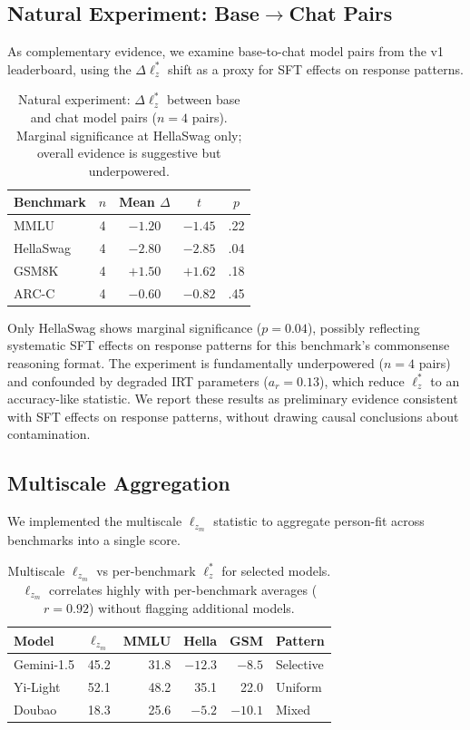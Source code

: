 \documentclass[11pt,a4paper]{article}
\begin{document}
\subsection{Natural Experiment: Base$\to$Chat Pairs}

As complementary evidence, we examine base-to-chat model pairs from the v1 leaderboard, using the $\Delta\ell_z^*$ shift as a proxy for SFT effects on response patterns.

\begin{table}[t]
\centering
\caption{Natural experiment: $\Delta\ell_z^*$ between base and chat model pairs ($n=4$ pairs). Marginal significance at HellaSwag only; overall evidence is suggestive but underpowered.}
\label{tab:natural}
\small
\begin{tabular}{lcccc}
\toprule
Benchmark & $n$ & Mean $\Delta$ & $t$ & $p$ \\
\midrule
MMLU & 4 & $-1.20$ & $-1.45$ & .22 \\
HellaSwag & 4 & $-2.80$ & $-2.85$ & .04 \\
GSM8K & 4 & $+1.50$ & $+1.62$ & .18 \\
ARC-C & 4 & $-0.60$ & $-0.82$ & .45 \\
\bottomrule
\end{tabular}
\end{table}

Only HellaSwag shows marginal significance ($p=0.04$), possibly reflecting systematic SFT effects on response patterns for this benchmark's commonsense reasoning format.
The experiment is fundamentally underpowered ($n=4$ pairs) and confounded by degraded IRT parameters ($a_r = 0.13$), which reduce $\ell_z^*$ to an accuracy-like statistic.
We report these results as preliminary evidence consistent with SFT effects on response patterns, without drawing causal conclusions about contamination.

\subsection{Multiscale Aggregation}

We implemented the multiscale $\ell_{z_m}$ statistic \citep{hong2021multiscale} to aggregate person-fit across benchmarks into a single score.

\begin{table}[t]
\centering
\caption{Multiscale $\ell_{z_m}$ vs per-benchmark $\ell_z^*$ for selected models. $\ell_{z_m}$ correlates highly with per-benchmark averages ($r=0.92$) without flagging additional models.}
\label{tab:lzm}
\small
\begin{tabular}{lrrrrl}
\toprule
Model & $\ell_{z_m}$ & MMLU & Hella & GSM & Pattern \\
\midrule
Gemini-1.5 & 45.2 & 31.8 & $-12.3$ & $-8.5$ & Selective \\
Yi-Light & 52.1 & 48.2 & 35.1 & 22.0 & Uniform \\
Doubao & 18.3 & 25.6 & $-5.2$ & $-10.1$ & Mixed \\
\bottomrule
\end{tabular}
\end{table}
\end{document}
